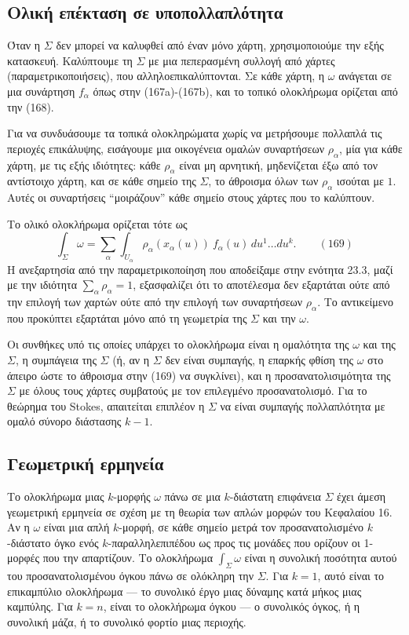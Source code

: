 \documentclass[12pt]{article}
\begin{document}
\subsection{Ολική επέκταση σε υποπολλαπλότητα}

Όταν η $\Sigma$ δεν μπορεί να καλυφθεί από έναν μόνο χάρτη, χρησιμοποιούμε την εξής κατασκευή. Καλύπτουμε τη $\Sigma$ με μια πεπερασμένη συλλογή από χάρτες (παραμετρικοποιήσεις), που αλληλοεπικαλύπτονται. Σε κάθε χάρτη, η $\omega$ ανάγεται σε μια συνάρτηση $f_\alpha$ όπως στην (167a)-(167b), και το τοπικό ολοκλήρωμα ορίζεται από την (168).

Για να συνδυάσουμε τα τοπικά ολοκληρώματα χωρίς να μετρήσουμε πολλαπλά τις περιοχές επικάλυψης, εισάγουμε μια οικογένεια ομαλών συναρτήσεων $\rho_\alpha$, μία για κάθε χάρτη, με τις εξής ιδιότητες: κάθε $\rho_\alpha$ είναι μη αρνητική, μηδενίζεται έξω από τον αντίστοιχο χάρτη, και σε κάθε σημείο της $\Sigma$, το άθροισμα όλων των $\rho_\alpha$ ισούται με $1$. Αυτές οι συναρτήσεις ``μοιράζουν'' κάθε σημείο στους χάρτες που το καλύπτουν.

Το ολικό ολοκλήρωμα ορίζεται τότε ως
\begin{equation}
\int_\Sigma \omega = \sum_\alpha \int_{U_\alpha} \rho_\alpha(x_\alpha(u)) \ f_\alpha(u) \, du^1 \dots du^k. \qquad (169)
\end{equation}
Η ανεξαρτησία από την παραμετρικοποίηση που αποδείξαμε στην ενότητα 23.3, μαζί με την ιδιότητα $\sum_\alpha \rho_\alpha = 1$, εξασφαλίζει ότι το αποτέλεσμα δεν εξαρτάται ούτε από την επιλογή των χαρτών ούτε από την επιλογή των συναρτήσεων $\rho_\alpha$. Το αντικείμενο που προκύπτει εξαρτάται μόνο από τη γεωμετρία της $\Sigma$ και την $\omega$.

Οι συνθήκες υπό τις οποίες υπάρχει το ολοκλήρωμα είναι η ομαλότητα της $\omega$ και της $\Sigma$, η συμπάγεια της $\Sigma$ (ή, αν η $\Sigma$ δεν είναι συμπαγής, η επαρκής φθίση της $\omega$ στο άπειρο ώστε το άθροισμα στην (169) να συγκλίνει), και η προσανατολισιμότητα της $\Sigma$ με όλους τους χάρτες συμβατούς με τον επιλεγμένο προσανατολισμό. Για το θεώρημα του Stokes, απαιτείται επιπλέον η $\Sigma$ να είναι συμπαγής πολλαπλότητα με ομαλό σύνορο διάστασης $k-1$.

\subsection{Γεωμετρική ερμηνεία}

Το ολοκλήρωμα μιας $k$-μορφής $\omega$ πάνω σε μια $k$-διάστατη επιφάνεια $\Sigma$ έχει άμεση γεωμετρική ερμηνεία σε σχέση με τη θεωρία των απλών μορφών του Κεφαλαίου 16. Αν η $\omega$ είναι μια απλή $k$-μορφή, σε κάθε σημείο μετρά τον προσανατολισμένο $k$-διάστατο όγκο ενός $k$-παραλληλεπιπέδου ως προς τις μονάδες που ορίζουν οι 1-μορφές που την απαρτίζουν. Το ολοκλήρωμα $\int_\Sigma \omega$ είναι η συνολική ποσότητα αυτού του προσανατολισμένου όγκου πάνω σε ολόκληρη την $\Sigma$. Για $k=1$, αυτό είναι το επικαμπύλιο ολοκλήρωμα — το συνολικό έργο μιας δύναμης κατά μήκος μιας καμπύλης. Για $k=n$, είναι το ολοκλήρωμα όγκου — ο συνολικός όγκος, ή η συνολική μάζα, ή το συνολικό φορτίο μιας περιοχής.
\end{document}
